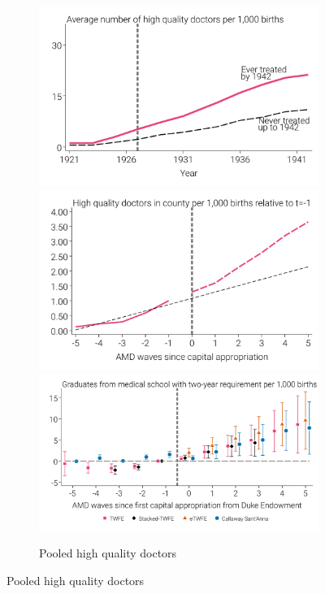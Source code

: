 \documentclass[12pt]{article}
\begin{document}
\begin{landscape}
\begin{figure}
\begin{minipage}{\linewidth}
\begin{subfigure}[b]{0.27\columnwidth}
    \end{subfigure}
    \hfill %
    \begin{subfigure}[b]{0.27\textwidth}
        \centering
        \caption{{Pooled high quality doctors}}\label{fig:md-pool-good}
        \includegraphics[width=\linewidth]{../analysis/output/main/figure_3b1_pooled_rMD_good_by_treat_status.pdf}
        \includegraphics[width=\linewidth]{../analysis/output/main/figure_3b2_pooled_rMD_good_by_event_time.pdf}
        \includegraphics[width=\linewidth]{../analysis/output/main/figure_3b3_pooled_rMD_good_first_stage.pdf}

\end{subfigure}
\end{minipage}
\end{figure}
\end{landscape}
\end{document}
